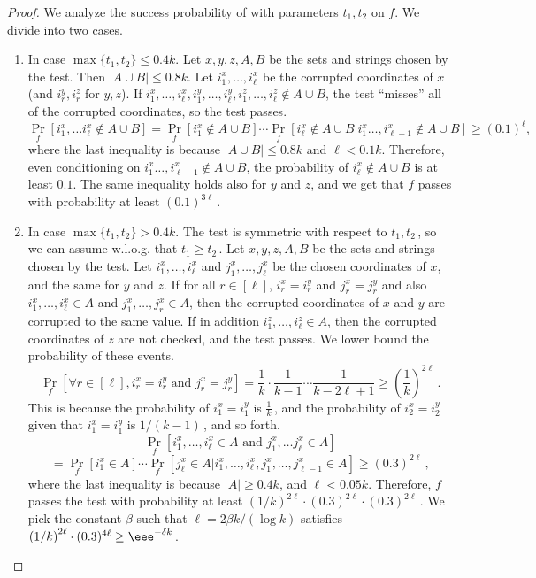 \documentclass{toc}
\newcommand{\Paren}[1]{\left(#1\right)} %
\newcommand{\abs}[1]{\lvert#1\rvert} %
\newcommand\f{f} %
\begin{document}
\begin{proof}
    We analyze the success probability of  with parameters $t_1,t_2$ on $\f$. We divide into two cases.
    \begin{enumerate}
        \item{In case $\max\{t_1,t_2\}\leq 0.4k$.} Let $x,y,z,A,B$ be the sets and strings chosen by the test. Then $\abs{A\cup B}\leq 0.8k$. Let $i_1^x,\ldots, i_\ell^x$ be the corrupted coordinates of $x$ (and $i_r^y,i_r^z$ for $y,z$). If $i_1^x,\ldots, i_\ell^x,i_1^y,\ldots, i_\ell^y,i_1^z,\ldots, i_\ell^z\notin A\cup B$, the test ``misses'' all of the corrupted coordinates, so the test passes. 
    \[ \Pr_f[i_1^x,\ldots i_\ell^x\notin A\cup B]=\Pr_f[i_1^x\notin A\cup B]\cdots\Pr_f[i_\ell^x\notin A\cup B|i_1^x\ldots, i_{\ell-1}^x\notin A\cup B]\geq (0.1)^\ell, \]
    where the last inequality is because $\abs{A\cup B}\leq 0.8k$ and $\ell < 0.1k$. Therefore, even conditioning on $i_1^x\ldots, i_{\ell-1}^x\notin A\cup B$, the probability of $i^x_\ell\notin A\cup B$ is at least $0.1$.
    The same inequality holds also for $y$ and $z$, and we get that $\f$ passes  with probability at least $(0.1)^{3\ell}$\,.
    \item {In case $\max\{t_1,t_2\}> 0.4k$.} The test is symmetric with respect to $t_1,t_2$\,, so we can assume w.l.o.g. that $t_1\geq t_2$\,. Let $x,y,z,A,B$ be the sets and strings chosen by the test. Let $i_1^x,\ldots, i_\ell^x$ and $j_1^x,\ldots, j_\ell^x$ be the chosen coordinates of $x$, and the same for $y$ and $z$. If for all $r\in[\ell]$, $i_r^x = i_r^y$ and $j_r^x = j_r^y$ and also $i_1^x,\ldots, i_\ell^x\in A$ and $j_1^x,\ldots, j_r^x\in A$, then the corrupted coordinates of $x$ and $y$ are corrupted to the same value. If in addition $ i_1^z,\ldots, i_\ell^z\in A$, then the corrupted coordinates of $z$ are not checked, and the test passes. We lower bound the probability of these events.
    \[ \Pr_f[\forall r\in[\ell], i_r^x = i_r^y \textrm{ and } j_r^x = j_r^y] =\frac{1}{k}\cdot\frac{1}{k-1}\cdots\frac{1}{k-2\ell+1} \geq\Paren{\frac{1}{k}}^{2\ell}\,. \]%
    This is because the probability of $i_1^x = i_1^y$ is $\frac{1}{k}$\,, and the probability of $i_2^x = i_2^y$ given that $i_1^x = i_1^y$ is 
%
%
$1/(k-1)$\,,  %
and so forth.
 $$\Pr_f[i_1^x,\ldots, i_\ell^x\in A\textrm{ and }j_1^x,\ldots j_\ell^x\in A] $$ %
$$ =\Pr_f[i_1^x\in A]\cdots\Pr_f[j_\ell^x\in A|i_1^x,\ldots, i_\ell^x,j_1^x,\ldots, j_{\ell-1}^x\in A]\geq (0.3)^{2\ell}\,, $$
where the last inequality is because $\abs{A}\geq 0.4k$, and $\ell < 0.05k$.
	Therefore, $\f$ passes the test with probability at least 
    $\Paren{1/k}^{2\ell}\cdot (0.3)^{2\ell}\cdot (0.3)^{2\ell}$\,. %
%
 We pick the constant $\beta$ such that 
    $\ell = {2\beta k}/{(\log k)}$ %
     satisfies 
    $\Paren{{1}/{k}}^{2\ell}\cdot (0.3)^{4\ell}\geq \eee^{-\delta k}$\,. %
\end{enumerate}
    

\end{proof}
\end{document}
